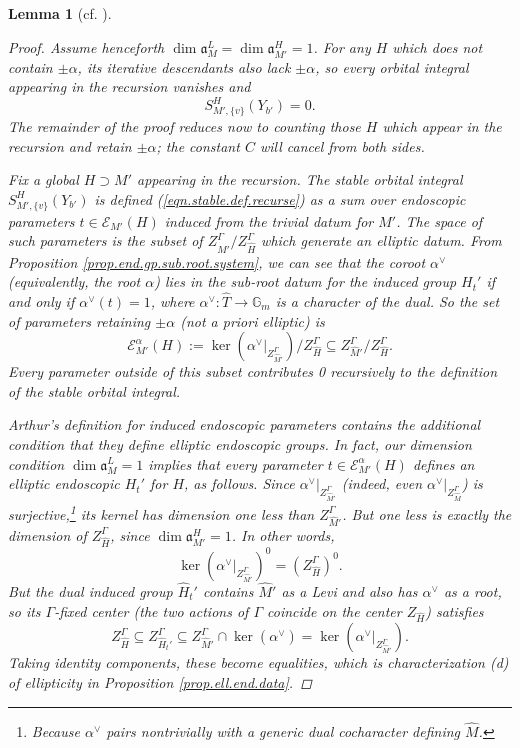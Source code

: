 \documentclass[openany]{amsbook}
\newtheorem{lemma}[theorem]{Lemma}
\theoremstyle{definition}
\theoremstyle{remark}
\numberwithin{equation}{section}
\newcommand{\G}{\mathbb{G}}
\newcommand{\cE}{\mathcal{E}}
\renewcommand{\-}{\operatorname{-}}
\renewcommand{\a}{\mathfrak{a}}
\begin{document}
\begin{lemma}[{cf. \cite[Lemme 17.6.2, Lemme 17.8.1]{CLII}}]
\begin{proof}
        Assume henceforth $\dim \a_M^L = \dim \a_{M'}^H = 1$. For any $H$ which does not contain $\pm \alpha$, its iterative descendants also lack $\pm \alpha$, so every orbital integral appearing in the recursion vanishes and
        $$
            S_{M', \{v\}}^{H}(Y_{b'}) = 0.
        $$
        The remainder of the proof reduces now to counting those $H$ which appear in the recursion and retain $\pm \alpha$; the constant $C$ will cancel from both sides.

        Fix a global $H \supset M'$ appearing in the recursion. The stable orbital integral $S^H_{M',\{v\}}(Y_{b'})$ is defined (\ref{eqn.stable.def.recurse}) as a sum over endoscopic parameters $t \in \cE_{M'}(H)$ induced from the trivial datum for $M'$. The space of such parameters is the subset of $Z_{\widehat{M}'}^\Gamma/Z_{\widehat{H}}^{\Gamma}$ which generate an elliptic datum. From Proposition \ref{prop.end.gp.sub.root.system}, we can see that the coroot $\alpha^\vee$ (equivalently, the root $\alpha$) lies in the sub-root datum for the induced group $H_t'$ if and only if $\alpha^\vee(t) = 1$, where $\alpha^\vee : \widehat{T} \to \G_m$ is a character of the dual. So the set of parameters retaining $\pm \alpha$ (not \textit{a priori elliptic}) is
        $$
            \cE_{M'}^{\alpha}(H) :=  \ker\left(\alpha^\vee|_{Z_{\widehat{M}'}^\Gamma}\right)/Z_{\widehat{H}}^{\Gamma} \subseteq Z_{\widehat{M}'}^\Gamma/Z_{\widehat{H}}^{\Gamma}.
        $$
        Every parameter outside of this subset contributes 0 recursively to the definition of the stable orbital integral.
        
        Arthur's definition for induced endoscopic parameters contains the additional condition that they define \emph{elliptic} endoscopic groups. In fact, our dimension condition $\dim \a_M^L = 1$ implies that \emph{every} parameter $t \in \cE_{M'}^\alpha(H)$ defines an elliptic endoscopic $H_t'$ for $H$, as follows. Since $\alpha^\vee|_{Z_{\widehat{M}'}^\Gamma}$ (indeed, even $\alpha^\vee|_{Z_{\widehat{M}}^\Gamma}$) is surjective,\footnote{Because $\alpha^\vee$ pairs nontrivially with a generic dual cocharacter defining $\widehat{M}$.} its kernel has dimension one less than $Z_{\widehat{M}'}^\Gamma$. But one less is exactly the dimension of $Z_{\widehat{H}}^\Gamma$, since $\dim \a_{M'}^H = 1$. In other words,
        $$
            \ker\left(\alpha^\vee|_{Z_{\widehat{M}'}^\Gamma}\right)^0 = \left(Z_{\widehat{H}}^{\Gamma}\right)^0.
        $$
        But the dual induced group $\widehat{H}_t'$ contains $\widehat{M}'$ as a Levi and also has $\alpha^\vee$ as a root, so its $\Gamma$-fixed center (the two actions of $\Gamma$ coincide on the center $Z_{\widehat{H}}$) satisfies
        $$
            Z_{\widehat{H}}^\Gamma \subseteq Z_{\widehat{H}_t'}^{\Gamma} \subseteq Z_{\widehat{M}'}^\Gamma \cap \ker(\alpha^\vee) = \ker\left(\alpha^\vee|_{Z_{\widehat{M}'}^\Gamma}\right).
        $$
        Taking identity components, these become equalities, which is characterization (d) of ellipticity in Proposition \ref{prop.ell.end.data}. 


\end{proof}
\end{lemma}
\end{document}
